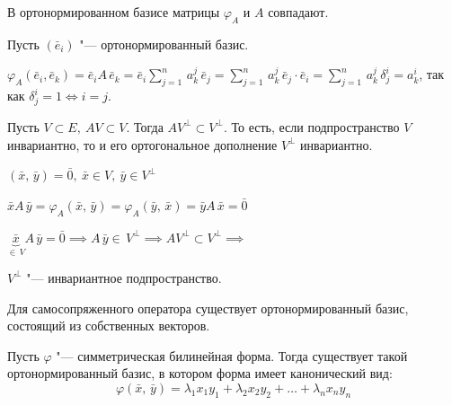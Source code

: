 \begin{theorem}
  В ортонормированном базисе матрицы $\varphi_A$ и $A$ совпадают.
\end{theorem}
\begin{Proof}
  Пусть $(\bar{e}_i)$ "--- ортонормированный базис.

  $\varphi_A(\bar{e}_i, \bar{e}_k) = \bar{e}_i A\, \bar{e}_k = \bar{e}_i \sum\limits_{j = 1}^n \, a_k^j \, \bar{e}_j = \sum\limits_{j = 1}^n \, a_k^j \, \bar{e}_j \cdot \bar{e}_i = \sum\limits_{j = 1}^n \, a_k^j \, \delta_j^i = a_k^i$, так как $\delta_j^i = 1 \Leftrightarrow i = j$.
\end{Proof}

\begin{theorem}
  Пусть $V \subset E, ~ AV \subset V$. Тогда $AV^{\bot} \subset V^{\bot}$. То есть, если подпространство $V$ инвариантно, то и его ортогональное дополнение $V^{\bot}$ инвариантно.
\end{theorem}
\begin{Proof}
  $(\bar{x}, \, \bar{y}) = \bar{0},~ \bar{x} \in V, ~ \bar{y} \in V^{\bot}$

  $\bar{x} A\, \bar{y} = \varphi_A(\bar{x}, \, \bar{y}) = \varphi_A(\bar{y},\, \bar{x}) = \bar{y} A\, \bar{x} = \bar{0}$

  $\underbrace{\bar{x}}_{\in \, V} A\, \bar{y} = \bar{0} \implies A\, \bar{y} \in \, V^{\bot} \implies AV^{\bot} \subset V^{\bot} \implies$
  
  $V^{\bot}$ "--- инвариантное подпространство. 
\end{Proof}

\begin{theorem}
  Для самосопряженного оператора существует ортонормированный базис, состоящий из собственных векторов.
\end{theorem}

\begin{theorem}
  Пусть $\varphi$ "--- симметрическая билинейная форма. Тогда существует такой ортонормированный базис, в котором форма имеет канонический вид:
  $$
    \varphi(\bar{x}, \, \bar{y}) = \lambda_1 x_1 y_1 + \lambda_2 x_2 y_2 + \ldots + \lambda_n x_n y_n
  $$
\end{theorem}